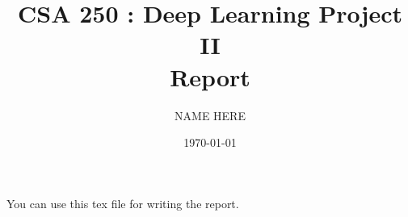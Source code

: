 \documentclass[10pt,a4paper]{article}
\title{CSA 250 : Deep Learning Project II \\ Report}
\author{NAME HERE}
\date{\today}
\begin{document}
\maketitle

You can use this tex file for writing the report. 







\end{document}
